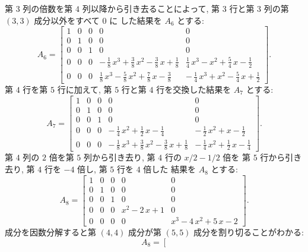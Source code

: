 \documentclass[12pt,twoside]{jarticle}
\begin{document}
\begin{example}
  第 $3$ 列の倍数を第 $4$ 列以降から引き去ることによって, 
  第 $3$ 行と第 $3$ 列の第 $(3,3)$ 成分以外をすべて $0$ に
  した結果を $A_6$ とする:
  \[
  A_6 =  \left[ 
    \begin{array}{rrrcc}
      1 & 0 & 0 & 0 & 0 \\
      0 & 1 & 0 & 0 & 0 \\
      0 & 0 & 1 & 0 & 0 \\
      0 & 0 & 0 &  - \,{\frac {1}{8}}\,{x}^{3} + 
      {\frac {3}{8}}\,{x}^{2} - {\frac {3}{
          8}}\,{x} + {\frac {1}{8}} & {\frac {1
          }{4}}\,{x}^{3} - {x}^{2} + {\frac {5}{4}}\,{x} - 
      {\frac {1}{2}} \\ [2ex]
      0 & 0 & 0 & {\frac {1}{8}}\,{x}^{3} - 
      {\frac {5}{8}}\,{x}^{2} + {\frac {7}{
          8}}\,{x} - {\frac {3}{8}} &  - \,{
        \frac {1}{4}}\,{x}^{3} + {x}^{2} - {\frac {5}{4}}\,
      {x} + {\frac {1}{2}}
    \end{array}
    \right].
  \]
  第 $4$ 行を第 $5$ 行に加えて, 第 $5$ 行と第 $4$ 行を交換した結果を $A_7$ 
  とする:
  \[
  A_7 =  \left[ 
    \begin{array}{rrrcc}
      1 & 0 & 0 & 0 & 0 \\
      0 & 1 & 0 & 0 & 0 \\
      0 & 0 & 1 & 0 & 0 \\
      0 & 0 & 0 &  - \,{\frac {1}{4}}\,{x}^{2} + 
      {\frac {1}{2}}\,{x} - {\frac {1}{4}}
      &  - \,{\frac {1}{2}}\,{x}^{2} + {x} - 
      {\frac {1}{2}} \\ [2ex]
      0 & 0 & 0 &  - \,{\frac {1}{8}}\,{x}^{3} + 
      {\frac {3}{8}}\,{x}^{2} - {\frac {3}{
          8}}\,{x} + {\frac {1}{8}} &  - \,{
        \frac {1}{4}}\,{x}^{2} + {\frac {1}{2}}\,{x} - 
      {\frac {1}{4}}
    \end{array}
  \right].
  \]
  第 $4$ 列の $2$ 倍を第 $5$ 列から引き去り, 第 $4$ 行の $x/2-1/2$ 倍を
  第 $5$ 行から引き去り, 第 $4$ 行を $-4$ 倍し, 第 $5$ 行を $4$ 倍した
  結果を $A_8$ とする:
  \[
  A_8 =  \left[ 
    \begin{array}{rrrcc}
      1 & 0 & 0 & 0 & 0 \\
      0 & 1 & 0 & 0 & 0 \\
      0 & 0 & 1 & 0 & 0 \\
      0 & 0 & 0 & x^2-2\,x+1 & 0 \\
      0 & 0 & 0 & 0 & x^3-4\,x^2+5\,x-2
    \end{array}
  \right].
  \]
  成分を因数分解すると第 $(4,4)$ 成分が第 $(5,5)$ 成分を割り切ることがわかる:
  \[
  A_8 =  \left[ 
\]
\end{example}
\end{document}

